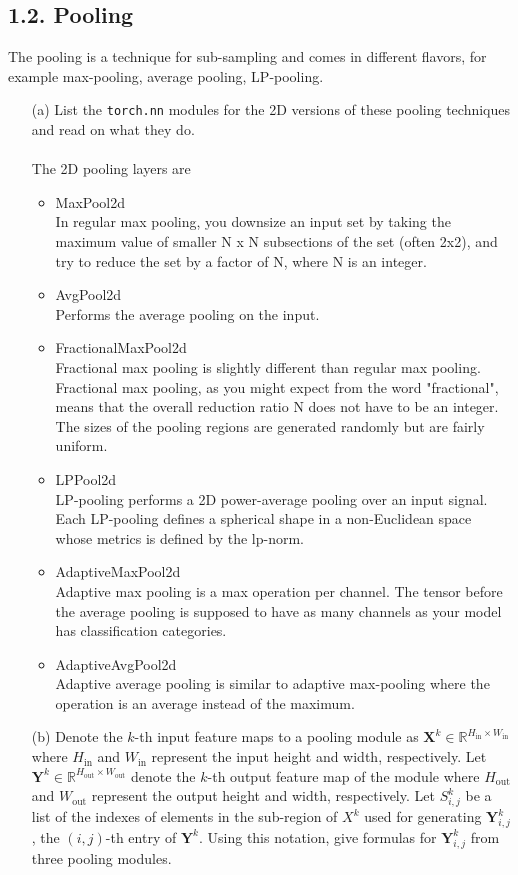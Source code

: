 \documentclass[11pt]{article}
\newcommand{\0}{\mat{0}}
\newcommand{\matr}[1]{\bm{#1}}     %
\begin{document}
\subsection*{1.2. Pooling}
The pooling is a technique for sub-sampling and comes in different flavors, for example max-pooling, average pooling, LP-pooling. 
\begin{itemize}
    \item[(a)] List the \texttt{torch.nn} modules for the 2D versions of these pooling techniques and read on what they do.\\
    \medskip
    \\
    The 2D pooling layers are
	\begin{itemize}
		\item MaxPool2d\\
		In regular max pooling, you downsize an input set by taking the maximum value of smaller N x N subsections of the set (often 2x2), and try to reduce the set by a factor of N, where N is an integer.
		\item AvgPool2d\\
		Performs the average pooling on the input.
		\item FractionalMaxPool2d\\
		Fractional max pooling is slightly different than regular max pooling.  Fractional max pooling, as you might expect from the word "fractional", means that the overall reduction ratio N does not have to be an integer. The sizes of the pooling regions are generated randomly but are fairly uniform.
		\item LPPool2d\\
		LP-pooling performs a 2D power-average pooling over an input signal. 
		 Each LP-pooling defines a spherical shape in a non-Euclidean space whose metrics is defined  by  the lp-norm.
		\item AdaptiveMaxPool2d\\
		Adaptive max pooling is a max operation per channel.
		The tensor before the average pooling is supposed to have as many channels as your model has classification categories.
		\item AdaptiveAvgPool2d\\
		Adaptive average pooling is similar to adaptive max-pooling where the operation is an average instead of the maximum.
	\end{itemize}
    
    
    \item[(b)] Denote the $k$-th input feature maps to a pooling module as $\matr{X}^k \in \mathbb{R}^{H_{\textrm{in}}\times W_{\textrm{in}}} $ where $H_{\textrm{in}}$ and $W_{\text{in}}$ represent the input height and width, respectively. Let $\matr{Y}^k \in \mathbb{R}^{H_{\text{out}}\times W_{\textrm{out}}}$ denote the $k$-th output feature map of the module where $H_{\textrm{out}}$ and $W_{\textrm{out}}$ represent the output height and width, respectively. Let $S^{k}_{i,j}$ be a list of the indexes of elements in the sub-region of $X^k $ used for generating $\matr{Y}^k_{i,j}$, the $(i,j)$-th entry of $\matr{Y}^{k}$. 
    Using this notation, give formulas for $\matr{Y}^k_{i,j} $ from three pooling modules.\\
    

\end{itemize}
\end{document}
